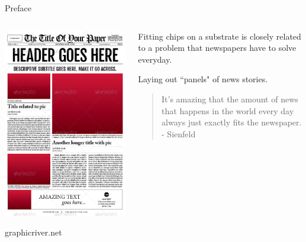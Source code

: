 \documentclass[xcolor=dvipsnames,onlymath,12pt,handout]{beamer}
\begin{document}
\begin{frame}{Preface}

\begin{columns}
  \begin{column}{0.5\textwidth}
	\begin{center}
	  \includegraphics[scale=0.23]{figs/news.png}
	  \par
	  graphicriver.net
	\end{center}
  \end{column}
  \begin{column}{0.5\textwidth}
  Fitting chips on a substrate is closely related to a problem that newspapers have to solve everyday.

\pause
\medskip

    Laying out ``panels" of news stories.
    
    \pause
    \medskip
    
\begin{quote}
It's amazing that the amount of news that happens in the world every day always just exactly fits the newspaper. - Sienfeld
\end{quote}
  \end{column}
\end{columns}


\end{frame}
\end{document}
